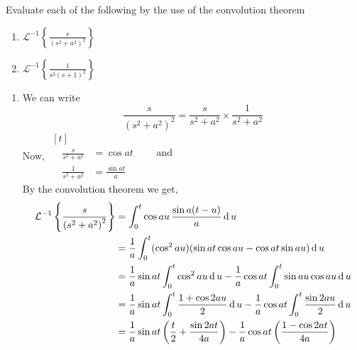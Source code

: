 \documentclass[12pt,class=book,crop=false]{standalone}
\newcommand{\ilap}[1]{\mathcal{L}^{-1}\left\{ #1\right\}}
\begin{document}
\begin{prob}
    Evaluate each of the following by the use of the convolution theorem
    \begin{enumerate}[label=(\alph*)]
        \item $ \displaystyle \ilap{\frac{s}{\left( s^2+a^2 \right)^2}} $
        \item $ \displaystyle \ilap{\frac{1}{s^2\left( s+1 \right)^2}} $
    \end{enumerate}
\end{prob}
\begin{soln}
    \begin{enumerate}[label=(\alph*)]
        \item We can write
              \[
                  \frac{s}{\left( s^2+a^2 \right)^2}=\frac{s}{s^2+a^2}\times \frac{1}{s^2+a^2}
              \]
              Now, $ \begin{aligned}[t]
                                        &                       \\
                      \quad \frac{s}{s^2+a^2} & =\cos at \qquad\text{ and } \\
                      \quad \frac{1}{s^2+a^2} & =\frac{\sin at}{a}
                  \end{aligned} $\\
              By the convolution theorem we get,
              \begin{align*}
                  \ilap{\frac{s}{\left( s^2+a^2 \right)^2}} & =\int_0^t \cos au \,\frac{\sin a(t-u)}{a}\D u                                                                                    \\
                                                            & =\frac{1}{a}\int_0^t (\cos^2 au) (\sin at \cos au -\cos at \sin au)\D u                                                          \\
                                                            & =\frac{1}{a}\sin at \int_0^t \cos^2 au\D u-\frac{1}{a}\cos at \int_0^t \sin au \cos au \D u                                     \\
                                                            & =\frac{1}{a}\sin at \int_0^t \frac{1+\cos 2au}{2}\D u-\frac{1}{a}\cos at \int_0^t \frac{\sin 2au}{2} \D u                       \\
                                                            & =\frac{1}{a}\sin at \left(\frac{t}{2}+ \frac{\sin 2at}{4a} \right)-\frac{1}{a}\cos at \left( \frac{1-\cos 2at}{4a} \right)      \\

\end{align*}
\end{enumerate}
\end{soln}
\end{document}

